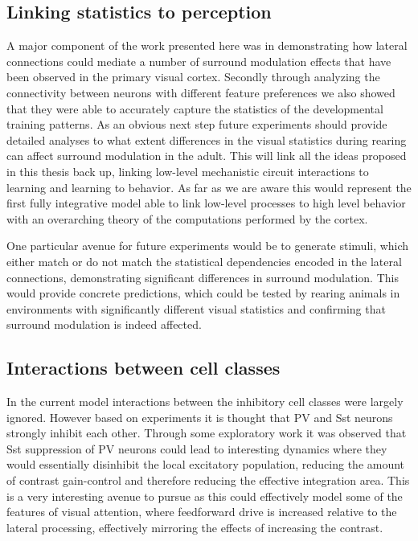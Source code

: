 \subsection{Linking statistics to perception}

A major component of the work presented here was in demonstrating how
lateral connections could mediate a number of surround modulation
effects that have been observed in the primary visual cortex. Secondly
through analyzing the connectivity between neurons with different
feature preferences we also showed that they were able to accurately
capture the statistics of the developmental training patterns. As an
obvious next step future experiments should provide detailed analyses
to what extent differences in the visual statistics during rearing can
affect surround modulation in the adult. This will link all the ideas
proposed in this thesis back up, linking low-level mechanistic circuit
interactions to learning and learning to behavior. As far as we are
aware this would represent the first fully integrative model able to
link low-level processes to high level behavior with an overarching
theory of the computations performed by the cortex.

One particular avenue for future experiments would be to generate
stimuli, which either match or do not match the statistical
dependencies encoded in the lateral connections, demonstrating
significant differences in surround modulation. This would provide
concrete predictions, which could be tested by rearing animals in
environments with significantly different visual statistics and
confirming that surround modulation is indeed affected.

\subsection{Interactions between cell classes}

In the current model interactions between the inhibitory cell classes
were largely ignored. However based on experiments it is thought that
PV and Sst neurons strongly inhibit each other. Through some
exploratory work it was observed that Sst suppression of PV neurons
could lead to interesting dynamics where they would essentially
disinhibit the local excitatory population, reducing the amount of
contrast gain-control and therefore reducing the effective integration
area. This is a very interesting avenue to pursue as this could
effectively model some of the features of visual attention, where
feedforward drive is increased relative to the lateral processing,
effectively mirroring the effects of increasing the contrast.


